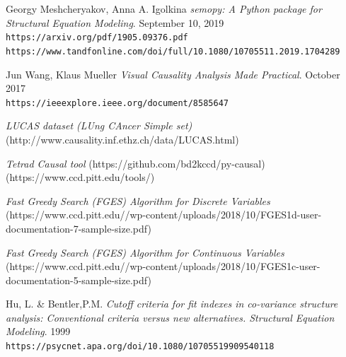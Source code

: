 \documentclass{vgtc}                          %
\begin{document}
\begin{thebibliography}{9}


Georgy Meshcheryakov, Anna A. Igolkina
\textit{semopy: A Python package for Structural
Equation Modeling}. September 10, 2019
 \\\texttt{https://arxiv.org/pdf/1905.09376.pdf}
  \\\texttt{https://www.tandfonline.com/doi/full/10.1080/10705511.2019.1704289}


Jun Wang, Klaus Mueller
\textit{Visual Causality Analysis Made Practical}. October 2017
 \\\texttt{https://ieeexplore.ieee.org/document/8585647}
 
\textit{LUCAS dataset (LUng CAncer Simple set)}
 (http://www.causality.inf.ethz.ch/data/LUCAS.html)
 
\textit{Tetrad Causal tool }
 (https://github.com/bd2kccd/py-causal)
 (https://www.ccd.pitt.edu/tools/)
 
\textit{Fast Greedy Search (FGES) Algorithm for Discrete Variables }
 (https://www.ccd.pitt.edu//wp-content/uploads/2018/10/FGES1d-user-documentation-7-sample-size.pdf)
 
\textit{Fast Greedy Search (FGES) Algorithm for Continuous Variables}
 (https://www.ccd.pitt.edu//wp-content/uploads/2018/10/FGES1c-user-documentation-5-sample-size.pdf)
 
Hu, L. \& Bentler,P.M. 
\textit{Cutoff criteria for fit indexes in co-variance structure analysis: Conventional criteria versus new alternatives. Structural Equation Modeling}. 1999
 \\\texttt{https://psycnet.apa.org/doi/10.1080/10705519909540118}

 
\end{thebibliography}
\end{document}

